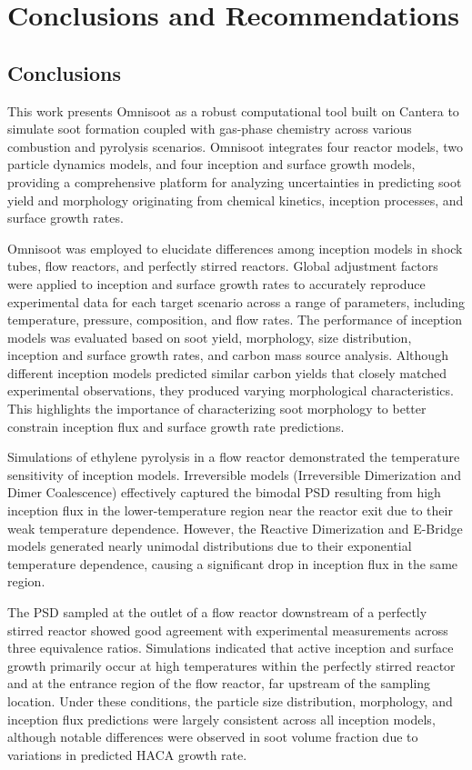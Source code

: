 \chapter{Conclusions and Recommendations}

\section{Conclusions}

This work presents Omnisoot as a robust computational tool built on Cantera to simulate soot formation coupled with gas-phase chemistry across various combustion and pyrolysis scenarios. Omnisoot integrates four reactor models, two particle dynamics models, and four inception and surface growth models, providing a comprehensive platform for analyzing uncertainties in predicting soot yield and morphology originating from chemical kinetics, inception processes, and surface growth rates.

Omnisoot was employed to elucidate differences among inception models in shock tubes, flow reactors, and perfectly stirred reactors. Global adjustment factors were applied to inception and surface growth rates to accurately reproduce experimental data for each target scenario across a range of parameters, including temperature, pressure, composition, and flow rates. The performance of inception models was evaluated based on soot yield, morphology, size distribution, inception and surface growth rates, and carbon mass source analysis. Although different inception models predicted similar carbon yields that closely matched experimental observations, they produced varying morphological characteristics. This highlights the importance of characterizing soot morphology to better constrain inception flux and surface growth rate predictions.

Simulations of ethylene pyrolysis in a flow reactor demonstrated the temperature sensitivity of inception models. Irreversible models (Irreversible Dimerization and Dimer Coalescence) effectively captured the bimodal PSD resulting from high inception flux in the lower-temperature region near the reactor exit due to their weak temperature dependence. However, the Reactive Dimerization and E-Bridge models generated nearly unimodal distributions due to their exponential temperature dependence, causing a significant drop in inception flux in the same region.

The PSD sampled at the outlet of a flow reactor downstream of a perfectly stirred reactor showed good agreement with experimental measurements across three equivalence ratios. Simulations indicated that active inception and surface growth primarily occur at high temperatures within the perfectly stirred reactor and at the entrance region of the flow reactor, far upstream of the sampling location. Under these conditions, the particle size distribution, morphology, and inception flux predictions were largely consistent across all inception models, although notable differences were observed in soot volume fraction due to variations in predicted HACA growth rate.



